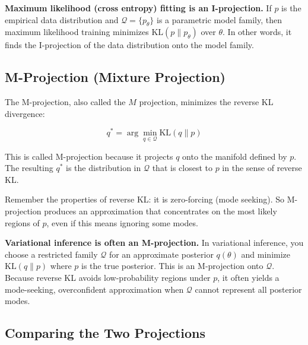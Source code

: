 \vspace{1em}

\textbf{Maximum likelihood (cross entropy) fitting is an I-projection.} If $p$ is the empirical data distribution and $\mathcal{Q}=\{p_\theta\}$ is a parametric model family, then maximum likelihood training minimizes $\text{KL}(p\|p_\theta)$ over $\theta$. In other words, it finds the I-projection of the data distribution onto the model family.

\vspace{1.5em}

\subsection{M-Projection (Mixture Projection)}

The M-projection, also called the $M$ projection, minimizes the reverse KL divergence:

\begin{equation}
q^* = \arg\min_{q \in \mathcal{Q}} \text{KL}(q \| p)
\end{equation}

This is called M-projection because it projects $q$ onto the manifold defined by $p$. The resulting $q^*$ is the distribution in $\mathcal{Q}$ that is closest to $p$ in the sense of reverse KL.

\vspace{1em}

Remember the properties of reverse KL: it is zero-forcing (mode seeking). So M-projection produces an approximation that concentrates on the most likely regions of $p$, even if this means ignoring some modes.

\vspace{1em}

\textbf{Variational inference is often an M-projection.} In variational inference, you choose a restricted family $\mathcal{Q}$ for an approximate posterior $q(\theta)$ and minimize $\text{KL}(q \| p)$ where $p$ is the true posterior. This is an M-projection onto $\mathcal{Q}$. Because reverse KL avoids low-probability regions under $p$, it often yields a mode-seeking, overconfident approximation when $\mathcal{Q}$ cannot represent all posterior modes.

\vspace{1.5em}

\subsection{Comparing the Two Projections}

